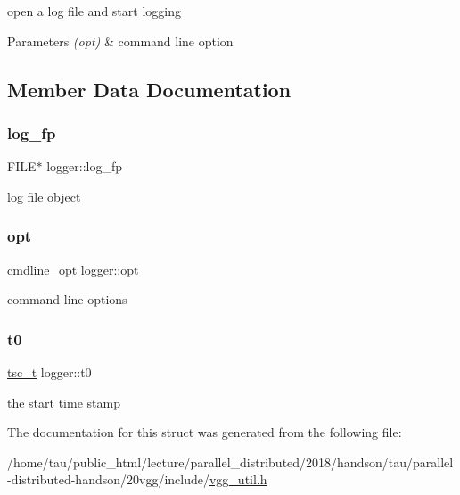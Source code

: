 open a log file and start logging 


\begin{DoxyParams}{Parameters}
{\em (opt)} & command line option \\
\hline
\end{DoxyParams}


\subsection{Member Data Documentation}
\mbox{\label{structlogger_ab891d941fb5846a3f8678f1db11c0da9}} 
\subsubsection{\texorpdfstring{log\+\_\+fp}{log\_fp}}
{\footnotesize\ttfamily F\+I\+LE$\ast$ logger\+::log\+\_\+fp}

log file object \mbox{\label{structlogger_a0e07e1e52c554084e6c3c06476024b9a}} 
\subsubsection{\texorpdfstring{opt}{opt}}
{\footnotesize\ttfamily \hyperlink{structcmdline__opt}{cmdline\+\_\+opt} logger\+::opt}

command line options \mbox{\label{structlogger_a6336fd3fffff10df04811a819c1c5a70}} 
\subsubsection{\texorpdfstring{t0}{t0}}
{\footnotesize\ttfamily \hyperlink{structtsc__t}{tsc\+\_\+t} logger\+::t0}

the start time stamp 

The documentation for this struct was generated from the following file\+:\begin{DoxyCompactItemize}
\item 
/home/tau/public\+\_\+html/lecture/parallel\+\_\+distributed/2018/handson/tau/parallel-\/distributed-\/handson/20vgg/include/\hyperlink{vgg__util_8h}{vgg\+\_\+util.\+h}\end{DoxyCompactItemize}

